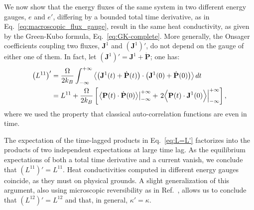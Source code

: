 We now show that the energy fluxes of the same system in two different energy gauges, $e$ and $e'$, differing by a bounded total time derivative, as in Eq.~\eqref{eq:macroscopic_flux_gauge}, result in the same heat conductivity, as given by the Green-Kubo formula, Eq.~\eqref{eq:GK-complete}. More generally, the Onsager coefficients coupling two fluxes, $\mathbf{J}^1$ and $\left(\mathbf{J}^1\right)'$, do not depend on the gauge of either one of them. In fact, let $\left(\mathbf{J}^1\right)' = \mathbf{J}^1 + \dot{\mathbf{P}}$; one has:
\begin{equation}
  \begin{aligned}
    \left (L^{11} \right)' &= \frac{\rOmega}{2 k_B }\int_{-\infty}^{+\infty} \left \langle \left (\mathbf{J}^1(t)+\dot{\mathbf{P}}(t) \right ) \cdot  \left (\mathbf{J}^1(0)+\dot{\mathbf{P}}(0)\right ) \right \rangle dt \\
    &= L^{11} + \frac{\rOmega}{2 k_B } \left[ \left .  \left \langle \mathbf{P}(t) \cdot \dot{\mathbf{P}}(0) \right \rangle \right |^{+\infty}_{-\infty} + \left .  2 \Bigl \langle \mathbf{P}(t) \cdot \mathbf{J}^1(0) \Bigr \rangle \right |^{+\infty}_{-\infty} \right] ,
  \end{aligned} \label{eq:L=L'}
\end{equation}
where we used the property that classical auto-correlation functions are even in time.

The expectation of the time-lagged products in Eq.~\eqref{eq:L=L'} factorizes into the products of two independent expectations at large time lag. As the equilibrium expectations of both a total time derivative and a current vanish, we conclude that $\left (L^{11}\right )'=L^{11}$. Heat conductivities computed in different energy gauges coincide, as they must on physical grounds. A slight generalization of this argument, also using microscopic reversibility as in Ref.~\cite{Onsager1931a,Onsager1931b}, allows us to conclude that $\left (L^{12} \right )'=L^{12}$ and that, in general, $\kappa'=\kappa$.

\bigskip
{}


